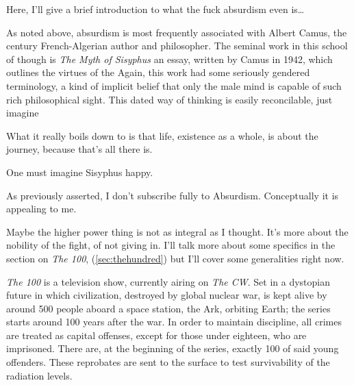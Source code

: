 \documentclass[../butidigress.tex]{subfiles}
\begin{document}
\entryskip

Here, I'll give a brief introduction to what the fuck absurdism even is\ldots

As noted above, absurdism is most frequently associated with Albert Camus, the  century French-Algerian author and philosopher.
The seminal work in this school of though is \textit{The Myth of Sisyphus} an essay, written by Camus in 1942, which outlines the virtues of the 
Again, this work had some seriously gendered terminology, a kind of implicit belief that only the male mind is capable of such rich philosophical sight.
This dated way of thinking is easily reconcilable, just imagine 

What it really boils down to is that life, existence as a whole, is about the journey, because that's all there is.\autocite{mythofsisyphus}

\epigraph{One must imagine Sisyphus happy.}{}
As previously asserted, I don't subscribe fully to Absurdism.
Conceptually it is appealing to me.

Maybe the higher power thing is not as integral as I thought.
It's more about the nobility of the fight, of not giving in.
I'll talk more about some specifics in the section on \textit{The 100}, (\ref{sec:thehundred}) but I'll cover some generalities right now.


\textit{The 100} is a television show, currently airing on \textit{The CW}.
Set in a dystopian future in which civilization, destroyed by global nuclear war, is kept alive by around 500 people aboard a space station, the Ark, orbiting Earth; the series starts around 100 years after the war.
In order to maintain discipline, all crimes are treated as capital offenses, except for those under eighteen, who are imprisoned.
There are, at the beginning of the series, exactly 100 of said young offenders.
These reprobates are sent to the surface to test survivability of the radiation levels.
\end{document}
